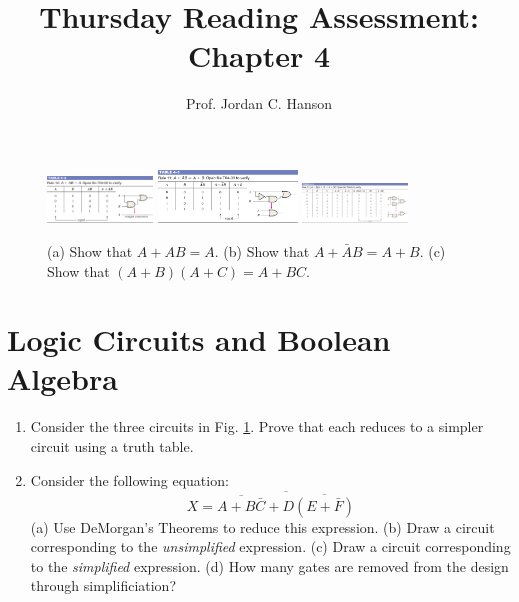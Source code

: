 \documentclass{article}
\begin{document}
\title{Thursday Reading Assessment: Chapter 4}
\author{Prof. Jordan C. Hanson}

\maketitle

\begin{figure}[ht]
\centering
\includegraphics[width=0.25\textwidth,trim=15cm 1cm 0cm 3cm,clip=true]{figures/AND_OR.jpg} \hspace{0.5cm}
\includegraphics[width=0.33\textwidth,trim=14cm 1cm 0cm 3cm,clip=true]{figures/AND_OR_2.jpg} \hspace{0.5cm}
\includegraphics[width=0.25\textwidth,trim=18cm 1cm 0cm 2.5cm,clip=true]{figures/AND_OR_3.jpg}
\caption{\label{fig:and} (a) Show that $A+AB = A$. (b) Show that $A+\bar{A}B = A+B$. (c) Show that $(A+B)(A+C) = A + BC$.}
\end{figure}

\section{Logic Circuits and Boolean Algebra}

\begin{enumerate}
\item Consider the three circuits in Fig. \ref{fig:and}.  Prove that each reduces to a simpler circuit using a truth table. \\ \vspace{2cm}
\item Consider the following equation:
\begin{equation}
X = \overline{\overline{A+B\bar{C}} + D\overline{(E+\bar{F})}}
\end{equation}
(a) Use DeMorgan's Theorems to reduce this expression. (b) Draw a circuit corresponding to the \textit{unsimplified} expression.  (c) Draw a circuit corresponding to the \textit{simplified} expression.  (d) How many gates are removed from the design through simplificiation?
\end{enumerate}
\end{document}
